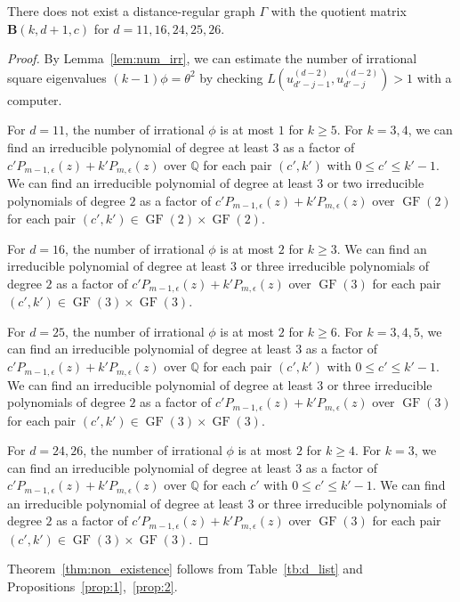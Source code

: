 \documentclass[ALCO,ThmDefs,Unicode,epreuves]{cedram}
\DeclareMathOperator{\GF}{GF}
\begin{document}
\begin{prop} \label{prop:2}
There does not exist a 
distance-regular graph $\Gamma$ with the quotient matrix $\boldsymbol{B} (k,d+1,c)$ for $d=11, 16,24,25,26$. 
\end{prop}
\begin{proof}
By Lemma~\ref{lem:num_irr}, we can estimate the number of irrational square eigenvalues $(k-1)\phi=\theta^2$ by checking $L(u_{d'-j-1}^{(d-2)},u_{d'-j}^{(d-2)})>1$ with a computer. 

For $d=11$, the number of irrational $\phi$ is at most $1$ for $k\geq 5$. 
For $k=3,4$, we can find an irreducible polynomial of degree at least $3$ as a factor of $c'P_{m-1,\epsilon}(z)+k'P_{m,\epsilon}(z)$ over $\mathbb{Q}$ for each pair $(c',k')$ with $0\leq c'\leq k'-1$. 
We can find an irreducible polynomial of degree at least $3$ or two irreducible polynomials of degree $2$ as a factor of $c'P_{m-1,\epsilon}(z)+k'P_{m,\epsilon}(z)$ over $\GF (2)$ for each pair $(c',k') \in \GF (2)\times \GF (2)$. 

For $d=16$, the number of irrational $\phi$ is at most $2$ for $k\geq 3$. 
We can find an irreducible polynomial of degree at least $3$ or three irreducible polynomials of degree $2$ as a factor of $c'P_{m-1,\epsilon}(z)+k'P_{m,\epsilon}(z)$ over $\GF (3)$ for each pair $(c',k') \in \GF (3)\times \GF (3)$. 

For $d=25$, the number of irrational $\phi$ is at most $2$ for $k\geq 6$.
For $k=3,4,5$, we can find an irreducible polynomial of degree at least $3$ as a factor of $c'P_{m-1,\epsilon}(z)+k'P_{m,\epsilon}(z)$ over $\mathbb{Q}$ for each pair $(c',k')$ with $0\leq c'\leq k'-1$. 
We can find an irreducible polynomial of degree at least $3$ or three irreducible polynomials of degree $2$ as a factor of $c'P_{m-1,\epsilon}(z)+k'P_{m,\epsilon}(z)$ over $\GF (3)$ for each pair $(c',k') \in \GF (3)\times \GF (3)$. 

For $d=24, 26$, the number of irrational $\phi$ is at most $2$ for $k\geq 4$. 
For $k=3$, we can find an irreducible polynomial of degree at least $3$ as a factor of $c'P_{m-1,\epsilon}(z)+k'P_{m,\epsilon}(z)$ over $\mathbb{Q}$ for each $c'$ with $0\leq c'\leq k'-1$.
We can find an irreducible polynomial of degree at least $3$ or three irreducible polynomials of degree $2$ as a factor of $c'P_{m-1,\epsilon}(z)+k'P_{m,\epsilon}(z)$ over $\GF (3)$ for each pair $(c',k') \in \GF (3)\times \GF (3)$. 
\end{proof}

Theorem~\ref{thm:non_existence} follows
from Table~\ref{tb:d_list} and Propositions~\ref{prop:1},~\ref{prop:2}. 
\end{document}
